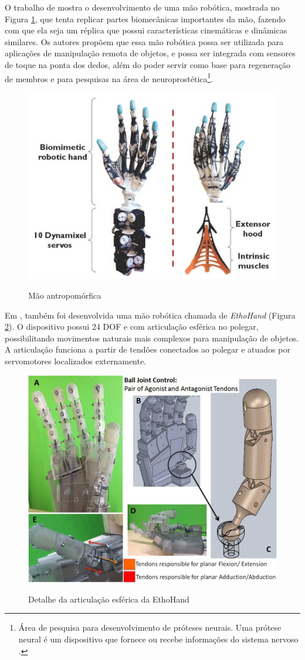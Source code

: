 O trabalho de  mostra o desenvolvimento de uma mão robótica, mostrada no Figura \ref{fig:antro_hand}, que tenta replicar partes biomecânicas importantes da mão, fazendo com que ela seja um réplica que possui características cinemáticas e dinâmicas similares. Os autores propõem que essa mão robótica possa ser utilizada para aplicações de manipulação remota de objetos, e possa ser integrada com sensores de toque na ponta dos dedos, além do poder servir como base para regeneração de membros e para pesquisas na área de neuroprostética\footnote{Área de pesquisa para desenvolvimento de próteses neurais. Uma prótese neural é um dispositivo que fornece ou recebe informações do sistema nervoso \cite{neuro}.}.

\begin{figure}[H]
  \setlength{\abovecaptionskip}{0pt}
  \setlength{\belowcaptionskip}{0pt}
  \caption[Mão antropomórfica]{Mão antropomórfica}
  \centering
  \includegraphics[width=.5\textwidth]{imagem/antro_hand}
  \captionsetup{justification=centering}
  \label{fig:antro_hand}
\end{figure}

Em , também foi desenvolvida uma mão robótica chamada de \textit{EthoHand} (Figura \ref{fig:etho_hand}). O dispositivo possui 24 \ac{DOF} e com articulação esférica no polegar, possibilitando movimentos naturais mais complexos para manipulação de objetos. A articulação funciona a partir de tendões conectados ao polegar e atuados por servomotores localizados externamente.

\begin{figure}[H]
  \setlength{\abovecaptionskip}{0pt}
  \setlength{\belowcaptionskip}{0pt}
  \caption[Detalhe da articulação esférica da EthoHand]{Detalhe da articulação esférica da EthoHand}
  \centering
  \includegraphics[width=.5\textwidth]{imagem/etho_hand}
  \captionsetup{justification=centering}
  \label{fig:etho_hand}
\end{figure}

